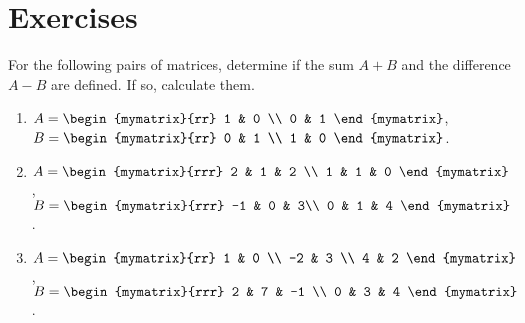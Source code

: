 \section*{Exercises}


\begin{ex}
  For the following pairs of matrices, determine if the sum $A+B$
  and the difference $A-B$ are defined. If so, calculate them.
  \begin{enumerate}
  \item
    $A = \begin{mymatrix}{rr}
      1 & 0 \\
      0 & 1
    \end{mymatrix}$,\quad
    $B = \begin{mymatrix}{rr}
      0 & 1 \\
      1 & 0
    \end{mymatrix}$.

  \item
    $A = \begin{mymatrix}{rrr}
      2 & 1 & 2 \\
      1 & 1 & 0
    \end{mymatrix}$,\quad
    $B = \begin{mymatrix}{rrr}
      -1 & 0 & 3\\
      0 & 1 & 4
    \end{mymatrix}$.

  \item
    $A = \begin{mymatrix}{rr}
      1 & 0 \\
      -2 & 3 \\
      4 & 2
    \end{mymatrix}$,\quad
    $B = \begin{mymatrix}{rrr}
      2 & 7 & -1 \\
      0 & 3 & 4
    \end{mymatrix}$.
  \end{enumerate}
\end{ex}

